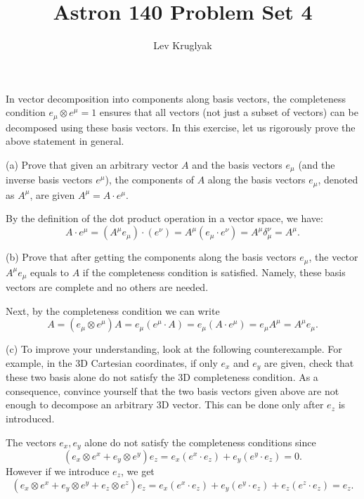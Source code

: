 \documentclass{../../templates/lkx_pset}
\title{Astron 140 Problem Set 4}
\author{Lev Kruglyak}
\begin{document}
\maketitle

\begin{problem}{1}
In vector decomposition into components along basis vectors, the completeness condition $e_\mu\otimes e^\mu=1$ ensures that all vectors (not just a subset of vectors) can be decomposed using these basis vectors. In this exercise, let us rigorously prove the above statement in general.
\end{problem}

\begin{parts}
	\begin{part}{(a)}
		Prove that given an arbitrary vector $A$ and the basis vectors $e_\mu$ (and the inverse basis vectors $e^\mu$), the components of $A$ along the basis vectors $e_\mu$, denoted as $A^\mu$, are given $A^\mu = A\cdot e^\mu$.
	\end{part}

	By the definition of the dot product operation in a vector space, we have:
	\[
		A\cdot e^\mu = (A^\mu e_\mu)\cdot (e^\nu) = A^\mu (e_\mu\cdot e^\nu) = A^\mu \delta^\nu_\mu = A^\mu.
	\]

	\begin{part}{(b)}
		Prove that after getting the components along the basis vectors $e_\mu$, the vector $A^\mu e_\mu$ equals to $A$ if the completeness condition is satisfied. Namely, these basis vectors are complete and no others are needed.
	\end{part}

	Next, by the completeness condition we can write
	\[
		A = (e_\mu\otimes e^\mu) A = e_\mu(e^\mu\cdot A) = e_\mu(A\cdot e^\mu) = e_\mu A^\mu = A^\mu e_\mu.
	\]

	\begin{part}{(c)}
		To improve your understanding, look at the following counterexample. For example, in the 3D Cartesian coordinates, if only $e_x$ and $e_y$ are given, check that these two basis alone do not satisfy the 3D completeness condition. As a consequence, convince yourself that the two basis vectors given above are not enough to decompose an arbitrary 3D vector. This can be done only after $e_z$ is introduced.
	\end{part}

  The vectors $e_x, e_y$ alone do not satisfy the completeness conditions since
  \[
    (e_x\otimes e^x + e_y\otimes e^y) e_z = e_x(e^x\cdot e_z) + e_y(e^y\cdot e_z) =  0.
  \]
  However if we introduce $e_z$, we get
  \[
    (e_x\otimes e^x + e_y\otimes e^y + e_z \otimes e^z) e_z = e_x(e^x\cdot e_z) + e_y(e^y\cdot e_z) + e_z(e^z\cdot e_z)=  e_z.
  \]
\end{parts}
\end{document}
